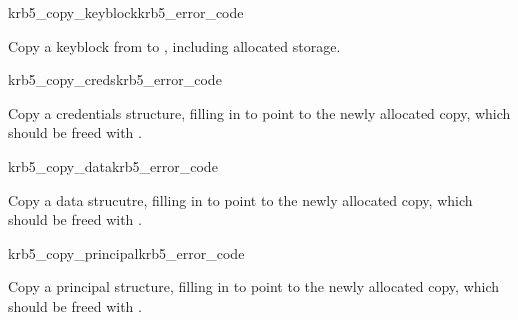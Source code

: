 \begin{funcdecl}{krb5_copy_keyblock}{krb5_error_code}{\funcin}
\funcout
{}
\end{funcdecl}

Copy a keyblock from  to , including
allocated storage.

\begin{funcdecl}{krb5_copy_creds}{krb5_error_code}{\funcin}
\funcout
{}
\end{funcdecl}

Copy a credentials structure, filling in  to point
to the newly allocated copy, which should be freed with
.

\begin{funcdecl}{krb5_copy_data}{krb5_error_code}{\funcin}
\funcout
{}
\end{funcdecl}

Copy a data strucutre, filling in  to point to the
newly allocated copy, which should be freed with .

\begin{funcdecl}{krb5_copy_principal}{krb5_error_code}{\funcin}
\funcout
{}
\end{funcdecl}
Copy a principal structure, filling in  to point to
the newly allocated copy, which should be freed with
.

